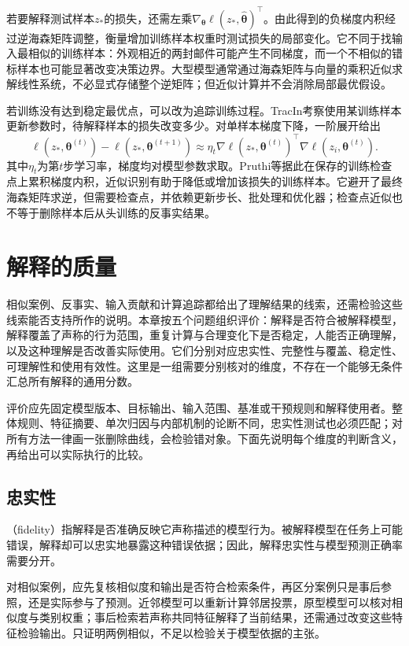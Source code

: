若要解释测试样本$z_*$的损失，还需左乘$\nabla_{\bm\theta}\ell(z_*,\hat{\bm\theta})^\top$。由此得到的负梯度内积经过逆海森矩阵调整，衡量增加训练样本权重时测试损失的局部变化。它不同于找输入最相似的训练样本：外观相近的两封邮件可能产生不同梯度，而一个不相似的错标样本也可能显著改变决策边界。大型模型通常通过海森矩阵与向量的乘积近似求解线性系统，不必显式存储整个逆矩阵；但近似计算并不会消除局部最优假设。

若训练没有达到稳定最优点，可以改为追踪训练过程。TracIn考察使用某训练样本更新参数时，待解释样本的损失改变多少。对单样本梯度下降，一阶展开给出
\[
 \ell(z_*,\bm\theta^{(t)})-\ell(z_*,\bm\theta^{(t+1)})
 \approx\eta_t
 \nabla\ell(z_*,\bm\theta^{(t)})^\top
 \nabla\ell(z_i,\bm\theta^{(t)}).
\]
其中$\eta_t$为第$t$步学习率，梯度均对模型参数求取。Pruthi等据此在保存的训练检查点上累积梯度内积，近似识别有助于降低或增加该损失的训练样本。它避开了最终海森矩阵求逆，但需要检查点，并依赖更新步长、批处理和优化器；检查点近似也不等于删除样本后从头训练的反事实结果。

\section{解释的质量}
\label{sec:interpretability-quality}

相似案例、反事实、输入贡献和计算追踪都给出了理解结果的线索，还需检验这些线索能否支持所作的说明。本章按五个问题组织评价：解释是否符合被解释模型，解释覆盖了声称的行为范围，重复计算与合理变化下是否稳定，人能否正确理解，以及这种理解是否改善实际使用。它们分别对应忠实性、完整性与覆盖、稳定性、可理解性和使用有效性。这里是一组需要分别核对的维度，不存在一个能够无条件汇总所有解释的通用分数。

评价应先固定模型版本、目标输出、输入范围、基准或干预规则和解释使用者。整体规则、特征摘要、单次归因与内部机制的论断不同，忠实性测试也必须匹配；对所有方法一律画一张删除曲线，会检验错对象。下面先说明每个维度的判断含义，再给出可以实际执行的比较。

\subsection{忠实性}
\label{sec:interpretability-quality-fidelity}

（fidelity）指解释是否准确反映它声称描述的模型行为。被解释模型在任务上可能错误，解释却可以忠实地暴露这种错误依据；因此，解释忠实性与模型预测正确率需要分开。

对相似案例，应先复核相似度和输出是否符合检索条件，再区分案例只是事后参照，还是实际参与了预测。近邻模型可以重新计算邻居投票，原型模型可以核对相似度与类别权重；事后检索若声称共同特征解释了当前结果，还需通过改变这些特征检验输出。只证明两例相似，不足以检验关于模型依据的主张。


